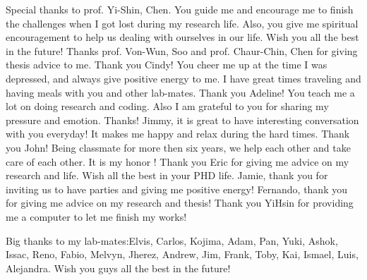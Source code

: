 \par Special thanks to prof. Yi-Shin, Chen. You guide me and encourage me to finish the challenges when I got lost during my research life. 
Also, you give me spiritual encouragement to help us dealing with ourselves in our life. Wish you all the best in the future! Thanks prof. Von-Wun, Soo and prof. Chaur-Chin, Chen for giving thesis advice to me.
Thank you Cindy! You cheer me up at the time I was depressed, and always give positive energy to me. I have great times traveling and having meals with you and other lab-mates. Thank you Adeline! You teach me a lot on doing research and coding. Also I am grateful to you for sharing my pressure and emotion. Thanks!
Jimmy, it is great to have interesting conversation with you everyday! It makes me happy and relax during the hard times.
Thank you John! Being classmate for more then six years, we help each other and take care of each other. It is my honor ! Thank you Eric for giving me advice on my research and life. Wish all the best in your PHD life. Jamie, thank you for inviting us to have parties and giving me positive energy! Fernando, thank you for giving me advice on my research and thesis!
Thank you YiHsin for providing me a computer to let me finish my works!
\par Big thanks to my lab-mates:Elvis, Carlos, Kojima, Adam, Pan, Yuki, Ashok, Issac, Reno, Fabio, Melvyn, Jherez, Andrew, Jim, Frank, Toby, Kai, Ismael, Luis, Alejandra. Wish you guys all the best in the future!
\clearpage